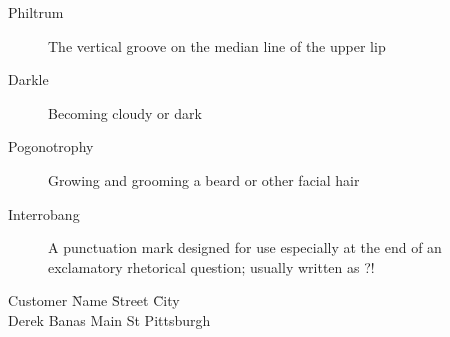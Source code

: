 \documentclass[a4paper,12pt]{book}
\begin{document}
 
\bigskip
 
 
 
\begin{description}
	\item[Philtrum] The vertical groove on the median line of the upper lip
	\item[Darkle] Becoming cloudy or dark
	\item[Pogonotrophy] Growing and grooming a beard or other facial hair
	\item[Interrobang] A punctuation mark designed for use especially at the end of an exclamatory rhetorical question; usually written as ?!
\end{description}
 
 
 
\begin{tabbing}
 
 
Customer  \= Name \hspace*{1.5cm} \= Street \hspace*{1.5cm} \= City \\
 
 
\> Derek Banas  Main St \> Pittsburgh \\
\end{tabbing}
 
 
 
 
\end{document}
